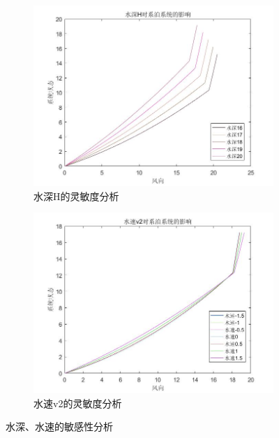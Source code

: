 \documentclass[UTF8]{ctexbook}
\theoremstyle{nonumberplain}
\begin{document}
            \begin{figure}[H]
                \centering
                \begin{subfigure}[b]{0.4\textwidth}
                    \includegraphics[width=\textwidth]{images/H_effect_xitong.jpg}
                    \caption{水深H的灵敏度分析}
                    \label{水深H的灵敏度分析}
                \end{subfigure}
                \begin{subfigure}[b]{0.4\textwidth}
                    \includegraphics[width=\textwidth]{images/v2_effect_xitong.jpg}
                    \caption{水速v2的灵敏度分析}
                    \label{水速v2的灵敏度分析}
                \end{subfigure}
                \caption{水深、水速的敏感性分析}
                \label{水深、水速的敏感性分析}
            \end{figure}
\end{document}
